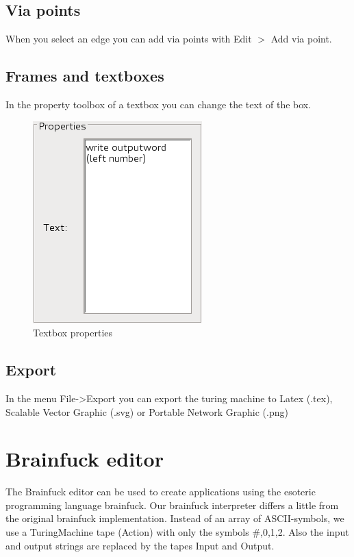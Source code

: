 \documentclass[%
  a4paper,%
  11pt,%
  blue,%
  hyperref	%
  ]{tubsartcl}
\begin{document}
\newpage

\subsection{Via points}
\label{sec:via-points}
When you select an edge you can add via points with Edit $>$ Add via point.

\subsection{Frames and textboxes}
\label{sec:frames-textboxes}
In the property toolbox of a textbox you can change the text of the box.
\begin{figure}[!htb]
\begin{center}
\includegraphics[scale=0.5]{graphics_gui/text_properties.png}
\end{center}
\caption{Textbox properties}
\label{pic:text_properties}
\end{figure}

\newpage

\subsection{Export}
\label{sec:export}
In the menu File->Export you can export the turing machine to Latex (.tex), Scalable Vector Graphic (.svg) or Portable Network Graphic (.png)
\newpage

\section{Brainfuck editor}
\label{sec:brainfuck-editor}
The Brainfuck editor  can be used to create applications using the esoteric programming language brainfuck. Our brainfuck interpreter differs a little from the original brainfuck implementation. Instead of an array of ASCII-symbols, we use a TuringMachine tape (Action) with only the symbols \#,0,1,2. Also the input and output strings are replaced by the tapes Input and Output.\\
\end{document}
